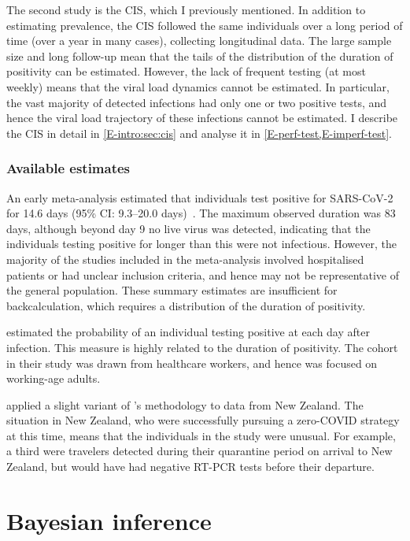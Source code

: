 \documentclass[thesis.tex]{subfiles}
\begin{document}
The second study is the CIS, which I previously mentioned.
In addition to estimating prevalence, the CIS followed the same individuals over a long period of time (over a year in many cases), collecting longitudinal data.
The large sample size and long follow-up mean that the tails of the distribution of the duration of positivity can be estimated.
However, the lack of frequent testing (at most weekly) means that the viral load dynamics cannot be estimated.
In particular, the vast majority of detected infections had only one or two positive tests, and hence the viral load trajectory of these infections cannot be estimated.
I describe the CIS in detail in \cref{E-intro:sec:cis} and analyse it in \cref{E-perf-test,E-imperf-test}.


\subsubsection{Available estimates}

An early meta-analysis estimated that individuals test positive for SARS-CoV-2 for 14.6 days (95\% CI: 9.3--20.0 days)~\autocite{cevikShedding}.
The maximum observed duration was 83 days, although beyond day 9 no live virus was detected, indicating that the individuals testing positive for longer than this were not infectious.
However, the majority of the studies included in the meta-analysis involved hospitalised patients or had unclear inclusion criteria, and hence may not be representative of the general population.
These summary estimates are insufficient for backcalculation, which requires a distribution of the duration of positivity.

\Textcite{hellewellPCRSensitivity} estimated the probability of an individual testing positive at each day after infection.
This measure is highly related to the duration of positivity.
The cohort in their study was drawn from healthcare workers, and hence was focused on working-age adults.

\Textcite{binnySensitivity} applied a slight variant of \textcite{hellewellPCRSensitivity}'s methodology to data from New Zealand.
The situation in New Zealand, who were successfully pursuing a zero-COVID strategy at this time, means that the individuals in the study were unusual.
For example, a third were travelers detected during their quarantine period on arrival to New Zealand, but would have had negative RT-PCR tests before their departure.




\section{Bayesian inference} \label{intro:sec:Bayes}
\end{document}
